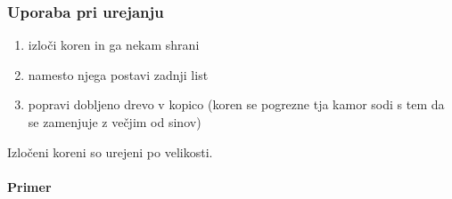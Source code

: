 \documentclass[a4paper,10pt]{article}
\begin{document}
\subsubsection{Uporaba pri urejanju}

\begin{enumerate}
\item izlo\v ci koren in ga nekam shrani %
\item namesto njega postavi zadnji list %
\item popravi dobljeno drevo v kopico (koren se pogrezne tja kamor sodi s tem da se zamenjuje z ve\v cjim od sinov)
\end{enumerate}
Izlo\v ceni koreni so urejeni po velikosti.

\paragraph{Primer}
\end{document}
